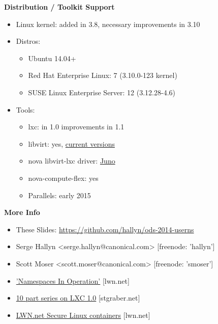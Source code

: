 \documentclass{beamer}
\begin{document}
\begin{frame}
\textbf{Distribution / Toolkit Support}
\begin{itemize}
\item Linux kernel: added in 3.8, necessary improvements in 3.10
\item Distros:
  \begin{itemize}
  \item Ubuntu 14.04+
  \item Red Hat Enterprise Linux: 7 (3.10.0-123 kernel)
  \item SUSE Linux Enterprise Server: 12 (3.12.28-4.6)
  \end{itemize}
\item Tools:
  \begin{itemize}
    \item lxc: in 1.0 improvements in 1.1
    \item libvirt: yes, \href{http://libvirt.org/git/?p=libvirt.git;a=commit;h=6c30ea2c353aa664397774ee42c425236371788b}{current versions}
    \item nova libvirt-lxc driver: \href{https://blueprints.launchpad.net/nova/+spec/libvirt-lxc-user-namespaces}{Juno}
    \item nova-compute-flex: yes
    \item Parallels: early 2015
  \end{itemize}
\end{itemize}
\end{frame}

\begin{frame}
\textbf{More Info}
\begin{itemize}
  \item These Slides: \url{https://github.com/hallyn/ods-2014-userns}
  \item Serge Hallyn <serge.hallyn@canonical.com> [freenode: 'hallyn']
  \item Scott Moser <scott.moser@canonical.com> [freenode: 'smoser']
  \item \href{http://lwn.net/Articles/531114/}{'Namespaces In Operation'} [lwn.net]
  \item \href{https://www.stgraber.org/2013/12/20/lxc-1-0-blog-post-series/}{10 part series on LXC 1.0} [stgraber.net]
  \item \href{http://lwn.net/Articles/515034/}{LWN.net Secure Linux containers} [lwn.net]
\end{itemize}
\end{frame}

\end{document}
